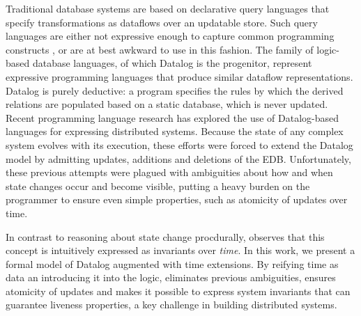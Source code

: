 Traditional database systems are based on declarative query languages that
specify transformations as dataflows over an updatable store.
  Such query
languages are either not expressive enough to capture common programming
constructs , or are at best awkward to use in this fashion.
 The family of logic-based database languages, of
which Datalog is the progenitor, represent expressive programming languages
that produce similar dataflow representations.  Datalog is purely deductive: a
program specifies the rules by which the derived relations are populated based
on a static database, which is never updated.  Recent programming language
research has explored the use of Datalog-based languages for expressing
distributed systems.  Because the state of any complex system evolves with its
execution, these efforts were forced to extend the Datalog model by admitting
updates, additions and deletions of the EDB.  Unfortunately, these previous
attempts were plagued with ambiguities about how and when state changes occur
and become visible, putting a heavy burden on the programmer to ensure even
simple properties, such as atomicity of updates over time.

In contrast to reasoning about state change procdurally, \lang observes
that this concept is intuitively expressed as invariants over {\em time}.  In
this work, we present a formal model of Datalog augmented with time extensions.
By reifying time as data an introducing it into the logic, \lang eliminates
previous ambiguities, ensures atomicity of updates and makes it possible to
express system invariants that can guarantee liveness properties, a key
challenge in building distributed systems.
